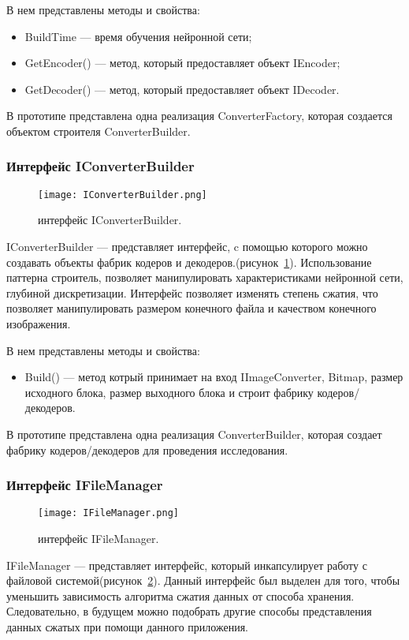 В нем представлены методы и свойства:
\begin{itemize}
  \item BuildTime --- время обучения нейронной сети;
  \item GetEncoder() --- метод, который предоставляет объект IEncoder;
  \item GetDecoder() --- метод, который предоставляет объект IDecoder.
\end{itemize}

В прототипе представлена одна реализация ConverterFactory, которая создается объектом строителя ConverterBuilder.

\subsubsection{Интерфейс IConverterBuilder}
\label{subsub:development:types:iconverterbuilder}

\begin{figure}[ht]
\centering
  \texttt{[image: IConverterBuilder.png]}
  \caption{ интерфейс IConverterBuilder. }
  \label{fig:iconverterbuilder}
\end{figure}
IConverterBuilder --- представляет интерфейс, c помощью которого можно создавать объекты фабрик кодеров и декодеров.(рисунок~\ref{fig:iconverterbuilder}).
Использование паттерна строитель, позволяет манипулировать характеристиками нейронной сети, глубиной дискретизации.
Интерфейс позволяет изменять степень сжатия, что позволяет манипулировать размером конечного файла и качеством конечного изображения.

В нем представлены методы и свойства:
\begin{itemize}
  \item Build() --- метод котрый принимает на вход IImageConverter, Bitmap, размер исходного блока,
  размер выходного блока и строит фабрику кодеров/декодеров.
\end{itemize}

В прототипе представлена одна реализация ConverterBuilder, которая создает фабрику кодеров/декодеров для проведения исследования.

\subsubsection{Интерфейс IFileManager}
\label{subsub:development:types:ifilemanager}

\begin{figure}[ht]
\centering
  \texttt{[image: IFileManager.png]}
  \caption{ интерфейс IFileManager. }
  \label{fig:ifilemanager}
\end{figure}
IFileManager --- представляет интерфейс, который инкапсулирует работу с файловой системой(рисунок~\ref{fig:ifilemanager}).
Данный интерфейс был выделен для того, чтобы уменьшить зависимость алгоритма сжатия данных от способа хранения.
Следовательно, в будущем можно подобрать другие способы представления данных сжатых при помощи данного приложения.

